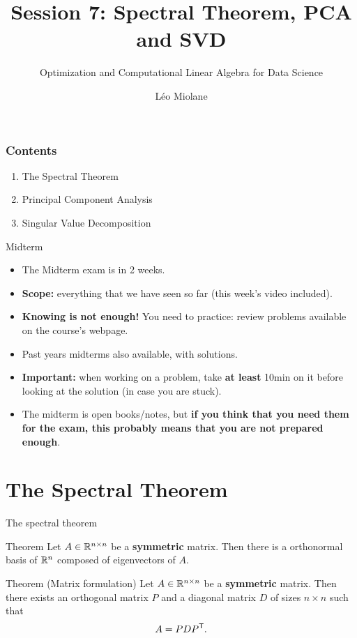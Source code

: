 \documentclass{beamer}
\title{Session 7: Spectral Theorem, PCA and SVD}
\subtitle{Optimization and Computational Linear Algebra for Data Science}
\author{Léo Miolane}
\date{}
\begin{document}
\setcounter{showProgressBar}{0}
\setcounter{showSlideNumbers}{0}

\frame{\titlepage}

\begin{frame}
	\frametitle{Contents}
	\begin{enumerate}
		\item The Spectral Theorem
		\item Principal Component Analysis
		\item Singular Value Decomposition
	\end{enumerate}
\end{frame}

\begin{frame}{Midterm}
	\begin{itemize}
		\item The Midterm exam is in 2 weeks.
			\vspace{1mm}
		\item \textbf{Scope:} everything that we have seen so far (this week's video included).
			\vspace{1mm}
		\item \textbf{Knowing is not enough!} You need to practice: review problems available on the course's webpage.
			\vspace{1mm}
		\item Past years midterms also available, with solutions.
			\vspace{1mm}
		\item \textbf{Important:} when working on a problem, take \textbf{at least} 10min on it before looking at the solution (in case you are stuck).
			\vspace{1mm}
		\item The midterm is open books/notes, but \textbf{if you think that you need them for the exam, this probably means that you are not prepared enough}.
	\end{itemize}
\end{frame}

\setcounter{framenumber}{0}
\setcounter{showSlideNumbers}{1}

\section{The Spectral Theorem}

\begin{frame}[t]{The spectral theorem}
	\grid

	\vspace{-0.3cm}
	\begin{block}{Theorem}
		Let $A \in \mathbb{R}^{n \times n}$ be a \textbf{symmetric} matrix. Then there is a orthonormal basis of $\mathbb{R}^n$ composed of eigenvectors of $A$.
	\end{block}

	\vspace{2.7cm}
	\begin{block}{Theorem (Matrix formulation)}
		Let $A \in \mathbb{R}^{n \times n}$ be a \textbf{symmetric} matrix. Then there exists an orthogonal matrix $P$ and a diagonal matrix $D$ of sizes $n \times n$ such that
		$$
		A = P D P^{{\sf T}}.
		$$
	\end{block}
\end{frame}
\end{document}
